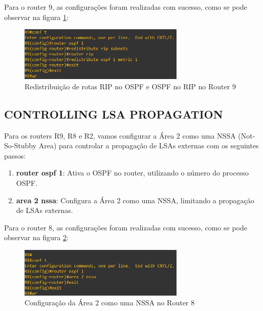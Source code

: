 \documentclass[11pt,english, openright, oneside]{book}
\begin{document}
\newpage
Para o router 9, as configurações foram realizadas com sucesso, como se pode observar na figura \ref{fig:config32}:
\vspace{0.2cm}

\begin{figure}[H]
  \centering
  \includegraphics[width=0.70\textwidth]{imagens/Tarefa4/19.redistribute_R9.png}
  \caption{Redistribuição de rotas RIP no OSPF e OSPF no RIP no Router 9}
  \label{fig:config32}
\end{figure}
\vspace{0.2cm}

\subsection{CONTROLLING LSA PROPAGATION}
\vspace{0.2cm}

Para os routers R9, R8 e R2, vamos configurar a Área 2 como uma NSSA (Not-So-Stubby Area) para controlar a propagação de LSAs externas com os seguintes passos:
\vspace{0.2cm}

\begin{enumerate}
  \item \textbf{router ospf 1}: Ativa o OSPF no router, utilizando o número do processo OSPF.
  \item \textbf{area 2 nssa}: Configura a Área 2 como uma NSSA, limitando a propagação de LSAs externas.
\end{enumerate}
\vspace{0.2cm}

Para o router 8, as configurações foram realizadas com sucesso, como se pode observar na figura \ref{fig:config33}:
\vspace{0.2cm}

\begin{figure}[H]
  \centering
  \includegraphics[width=0.70\textwidth]{imagens/Tarefa4/20.nssa_R8.png}
  \caption{Configuração da Área 2 como uma NSSA no Router 8}
  \label{fig:config33}
\end{figure}
\vspace{0.2cm}
\end{document}
